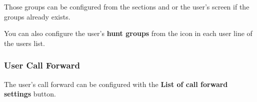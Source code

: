 \documentclass[letterpaper,10pt,spanish]{sphinxmanual}
\begin{document}
Those groups can be configured from the sections {\hyperref[administration_portal/client/vpbx/routing_endpoints/hunt_groups:huntgroups]{}} and
{\hyperref[administration_portal/client/vpbx/user_configuration/pick_up_groups:capture\string-groups]{}} or the user's screen if the groups already exists.

You can also configure the user's \textbf{hunt groups} from the icon in each user
line of the users list.


\subsubsection{User Call Forward}
\label{administration_portal/client/vpbx/users:user-call-forward}
The user's call forward can be configured with the \textbf{List of call forward settings}  button.
\end{document}
